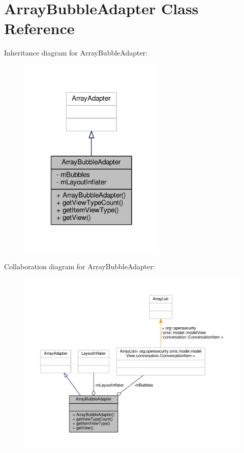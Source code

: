 \hypertarget{a00002}{\section{Array\+Bubble\+Adapter Class Reference}
\label{a00002}
}


Inheritance diagram for Array\+Bubble\+Adapter\+:
\nopagebreak
\begin{figure}[H]
\begin{center}
\leavevmode
\includegraphics[width=198pt]{a00052}
\end{center}
\end{figure}


Collaboration diagram for Array\+Bubble\+Adapter\+:
\nopagebreak
\begin{figure}[H]
\begin{center}
\leavevmode
\includegraphics[width=350pt]{a00053}
\end{center}
\end{figure}
